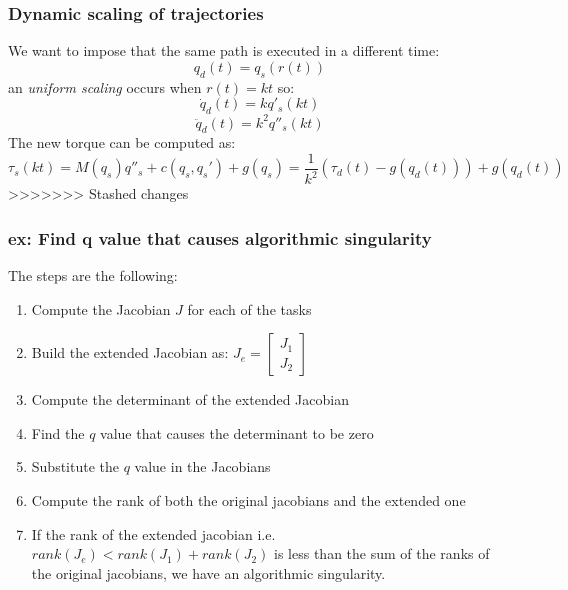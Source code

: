 \documentclass[a4paper,12pt]{article}
\begin{document}
\subsubsection{Dynamic scaling of trajectories}
We want to impose that the same path is executed in a different time:
\begin{equation}
  q_d(t) = q_s(r(t))
\end{equation}
an \textit{uniform scaling} occurs when $r(t)=kt$ so:
\begin{equation}
    \dot{q}_d(t) = kq'_s(kt)
\end{equation}
\begin{equation}
    \ddot{q}_d(t) = k^2q''_s(kt)
\end{equation}
The new torque can be computed as:
\begin{equation}
    \tau_s(kt) = M(q_s)q''_s+c(q_s,q_s')+g(q_s) = \frac{1}{k^2}(\tau_d(t)-g(q_d(t)))+g(q_d(t))
\end{equation}
>>>>>>> Stashed changes
    \subsubsection{ex: Find q value that causes algorithmic singularity}
The steps are the following:
\begin{enumerate}
    \item Compute the Jacobian $J$ for each of the tasks
    \item Build the extended Jacobian as: $J_e = \begin{bmatrix}
        J_1 \\
        J_2
    \end{bmatrix}$
    \item Compute the determinant of the extended Jacobian
    \item Find the $q$ value that causes the determinant to be zero
    \item Substitute the $q$ value in the Jacobians
    \item Compute the rank of both the original jacobians and the extended one
    \item If the rank of the extended jacobian i.e. $rank(J_e) < rank(J_1) + rank(J_2)$
    is less than the sum of the ranks of 
    the original jacobians, we have an algorithmic singularity.
\end{enumerate}
\end{document}
